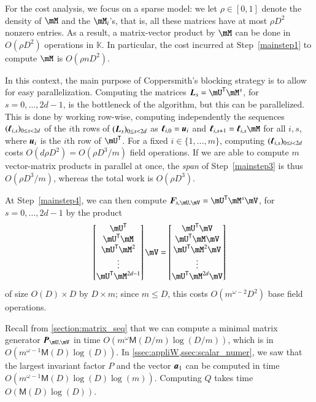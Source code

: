 \documentclass[final,1p,times,authoryear]{elsarticle}
\newcommand{\mat}[1]{\bm{\MakeUppercase{#1}}} %
\newcommand{\row}[1]{\bm{\MakeLowercase{#1}}} %
\newcommand{\seqelt}[1]{\bm{F}_{#1}} %
\newcommand{\sqfree}{Q}
\newcommand{\trsp}[1]{#1^{\mathsf{T}}} %
\newcommand{\density}{\rho}
\def\M {\ensuremath{\mathsf{M}}}
\def\K{\mathbb{K}}
\def\K {\ensuremath{\mathbb{K}}}
\newcommand{\mUt}{\trsp{\mU}}
\begin{document}
For the cost analysis, we focus on a sparse model: we let $\density
\in [0,1]$ denote the density of $\mM$ and the $\mM_i$'s, that is, all
these matrices have at most $\density D^2$ nonzero entries.  As a
result, a matrix-vector product by $\mM$ can be done in $O(\density
D^2)$ operations in $\K$. In particular, the cost incurred at
Step~\ref{mainstep1} to compute $\mM$ is $O(\density n D^2)$.

In this context, the main purpose of Coppersmith's blocking strategy
is to allow for easy parallelization. Computing the matrices
$\mat{L}_s=\mUt\mM^s$, for $s=0,\dots,2d-1$, is the bottleneck
of the algorithm, but this can be parallelized. This is done by
working row-wise, computing independently the sequences
$(\row{\ell}_{i,s})_{0 \le s < 2d}$ of the $i$th rows of
$(\mat{L}_s)_{0 \le s < 2d}$ as $\row{\ell}_{i,0}=\row{u}_i$ and
$\row{\ell}_{i,s+1} = \row{\ell}_{i,s}
\mM$ for all $i,s$, where $\row{u}_i$ is the $i$th row of $\mUt$.
For a fixed $i \in \{1,\dots,m\}$, computing $(\mat{\ell}_{i,s})_{0
\le i < 2d}$ costs $O(d \density D^2) = O(\density D^3/m )$ field operations. If
we are able to compute $m$ vector-matrix products in parallel at once,
the {\em span} of Step~\ref{mainstep3} is thus $O(\density D^3/m)$, whereas
the total work is $O(\density D^3)$.

At Step~\ref{mainstep4}, we can then compute $\seqelt{s,\mU,\mV}=\mUt\mM^s\mV$, for $s=0,\dots,2d-1$ by the
product
$$
\begin{bmatrix}
  \mUt\\
  \mUt \mM\\
  \mUt \mM^2\\
  \vdots\\
  \mUt \mM^{2d-1}\\
\end{bmatrix} \mV
= 
\begin{bmatrix}
  \mUt \mV\\
  \mUt \mM \mV\\
  \mUt \mM^2 \mV\\
  \vdots \\
  \mUt \mM^{2d} \mV\\
\end{bmatrix}
$$
of size $O(D) \times D$ by $D \times m$; since $m \le D$, this  costs $O(m^{\omega-2}D^2)$
base field operations.

Recall from \cref{section:matrix_seq} that we can compute a minimal
matrix generator $\mat{P}_{\mU,\mV}$ in time $O(m^{\omega}
\M(D/m) \log(D/m))$, which is in $O(m^{\omega-1} \M(D) \log(D))$.  In
\cref{ssec:appliW,ssec:scalar_numer}, we saw that the
largest invariant factor $P$ and the vector $\row{a}_1$ can be
computed in time $O(m^{\omega-1} \M(D) \log(D) \log(m))$.  Computing $\sqfree$
takes time $O(\M(D) \log(D))$.
\end{document}
